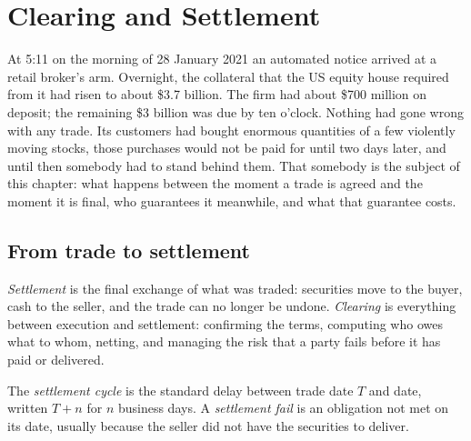 \chapter{Clearing and Settlement}\label{ch:m1:clearing-and-settlement}

At 5:11 on the morning of 28 January 2021 an automated notice arrived at a
retail broker's  arm. Overnight, the collateral that the US equity
 house required from it had risen to about \$3.7 billion. The firm
had about \$700 million on deposit; the remaining \$3 billion was due by
ten o'clock. Nothing had gone wrong with any trade. Its customers had bought
enormous quantities of a few violently moving stocks, those purchases would
not be paid for until two days later, and until then somebody had to stand
behind them. That somebody is the subject of this chapter: what happens
between the moment a trade is agreed and the moment it is final, who
guarantees it meanwhile, and what that guarantee costs.

\section{From trade to settlement}

\begin{definition}\label{def:m1:clearing-and-settlement:clearing}
\emph{Settlement} is the final exchange of what was traded:
securities move to the buyer, cash to the seller, and the trade can no longer
be undone. \emph{Clearing} is everything between execution
and settlement: confirming the terms, computing who owes what to whom,
netting, and managing the risk that a party fails before it has paid or
delivered.
\end{definition}

\begin{definition}\label{def:m1:clearing-and-settlement:cycle}
The \emph{settlement cycle} is the standard delay
between trade date $T$ and  date, written $T{+}n$ for $n$ business
days. A \emph{settlement fail} is an obligation not
met on its  date, usually because the seller did not have the
securities to deliver.
\end{definition}

